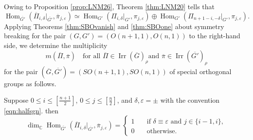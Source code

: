 Owing to Proposition \ref{prop:LNM26}, 
 Theorem \ref{thm:LNM20} tells that 
\begin{equation*}
 \operatorname{Hom}_{\overline{G'}}(\overline{\Pi}_{i,\delta}|_{\overline{G'}}, \overline{\pi}_{j, \varepsilon})
\simeq
  \operatorname{Hom}_{G'}(\Pi_{i,\delta}|_{G'}, \pi_{j,\varepsilon})
  \oplus
  \operatorname{Hom}_{G'}(\Pi_{n+1-i,-\delta}|_{G'}, \pi_{j, \varepsilon}).
\end{equation*}
Applying Theorems \ref{thm:SBOvanish} and \ref{thm:SBOone}
 about symmetry breaking for the pair
 $(G,G')=(O(n+1,1), O(n,1))$
 to the right-hand side, 
 we determine the multiplicity
\[
   m(\overline \Pi, \overline \pi)
\quad
\text{for all $\overline \Pi \in {\operatorname{Irr}}(\overline G)_{\rho}$
      and $\overline \pi \in {\operatorname{Irr}}(\overline {G'})_{\rho}$}
\]
 for the pair $(\overline G, \overline{G'})=(SO(n+1,1), SO(n,1))$
 of special orthogonal groups as follows.  
\begin{theorem}
\label{thm:170336}
Suppose $0 \le i \le [\frac{n+1}{2}]$, 
 $0 \le j \le [\frac{n}{2}]$, 
 and $\delta, \varepsilon = \pm$
 with the convention \eqref{eqn:halfsgn}.  
then 
\[
\dim_{\mathbb{C}} {\operatorname{Hom}}_{\overline{G'}}
(\overline{\Pi}_{i,\delta}|_{\overline{G'}}, 
 \overline{\pi}_{j,\varepsilon})
=
\begin{cases}
1
\quad
&\text{if $\delta \equiv \varepsilon$ and $j \in \{i-1,i\}$},
\\
0
&\text{otherwise.}
\end{cases}
\]
\end{theorem}






